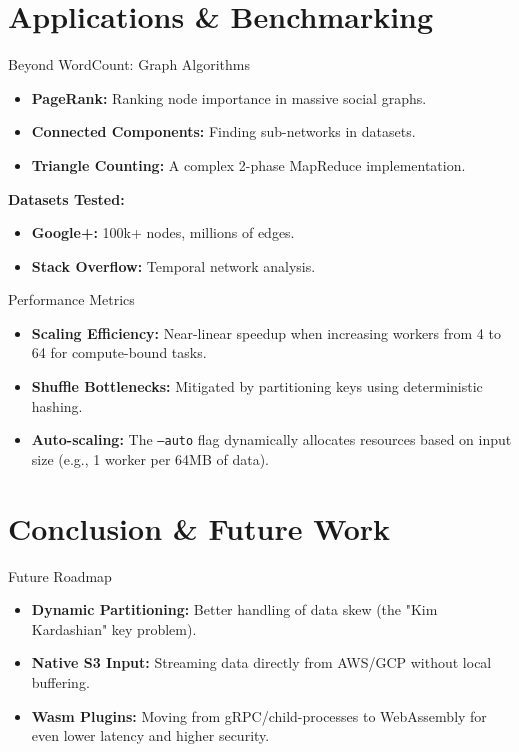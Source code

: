 \documentclass[10pt,aspectratio=169]{beamer}
\begin{document}
\section{Applications \& Benchmarking}

\begin{frame}{Beyond WordCount: Graph Algorithms}
    \begin{itemize}
        \item \textbf{PageRank:} Ranking node importance in massive social graphs.
        \item \textbf{Connected Components:} Finding sub-networks in datasets.
        \item \textbf{Triangle Counting:} A complex 2-phase MapReduce implementation.
    \end{itemize}
    \vfill
    \textbf{Datasets Tested:}
    \begin{itemize}
        \item \textbf{Google+:} 100k+ nodes, millions of edges.
        \item \textbf{Stack Overflow:} Temporal network analysis.
    \end{itemize}
\end{frame}

\begin{frame}{Performance Metrics}
    \begin{itemize}
        \item \textbf{Scaling Efficiency:} Near-linear speedup when increasing workers from 4 to 64 for compute-bound tasks.
        \item \textbf{Shuffle Bottlenecks:} Mitigated by partitioning keys using deterministic hashing.
        \item \textbf{Auto-scaling:} The \texttt{--auto} flag dynamically allocates resources based on input size (e.g., 1 worker per 64MB of data).
    \end{itemize}
\end{frame}

\section{Conclusion \& Future Work}

\begin{frame}{Future Roadmap}
    \begin{itemize}
        \item \textbf{Dynamic Partitioning:} Better handling of data skew (the "Kim Kardashian" key problem).
        \item \textbf{Native S3 Input:} Streaming data directly from AWS/GCP without local buffering.
        \item \textbf{Wasm Plugins:} Moving from gRPC/child-processes to WebAssembly for even lower latency and higher security.
    \end{itemize}
\end{frame}
\end{document}
